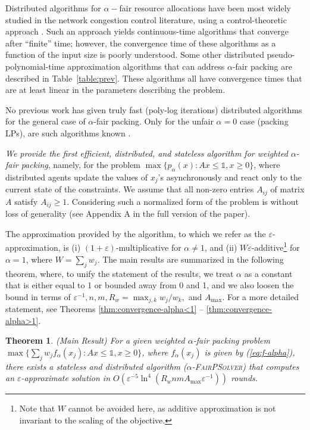 \documentclass[11pt]{article}
\makeatletter
\newcommand{\wratio}{R_w}
\newtheorem{theorem}{Theorem}[section]
\renewcommand{\paragraph}{\@startsection{paragraph}{4}{\z@}{1ex \@plus 1ex \@minus .2ex}{-.5em}{\normalfont\normalsize\bfseries}}
\newif\iffullpaper
\makeatother
\begin{document}
Distributed algorithms for $\alpha-$fair resource allocations have been most widely studied in the network congestion control literature, using a control-theoretic approach \cite{kelly1998rate, kelly2014stochastic, yi2008stochastic, paganini2005congestion, MoWalrand2000, low2002internet}. Such an approach yields continuous-time algorithms that converge after ``finite'' time; however, the convergence time of these algorithms as a function of the input size is poorly understood. Some  other distributed pseudo-polynomial-time approximation algorithms that can address $\alpha$-fair packing are described in Table~\ref{table:prev}. These algorithms all have convergence times that are at least linear in the parameters describing the problem.  

No previous work has given truly fast (poly-log iterations) distributed algorithms for the general case of $\alpha$-fair packing.  Only for the unfair $\alpha=0$ case (packing LPs), are such algorithms  known \cite{AwerbuchKhandekar2009, d-luby1993parallel, d-bartal1997global, dc-young2001sequential, d-kuhn2006price, d-allen2014using}.


\paragraph{Our Results.} 
\emph{We provide the first  efficient, distributed, {and stateless} algorithm for weighted $\alpha$-fair packing}, namely, for the problem $\max\{p_\alpha(x): Ax\leq \mathds{1}, x\geq 0\}$,  {where distributed agents update the values of $x_j$'s asynchronously and react only to the current state of the constraints}. We assume that all non-zero entries $A_{ij}$ of matrix $A$ satisfy $A_{ij}\geq 1$. Considering such a normalized form of the problem is without loss of generality (see Appendix \iffullpaper \ref{appendix:scaling}\else {A} in the full version of the paper\fi).  

The approximation provided by the algorithm, to which we refer as the  $\varepsilon$-approximation, is (i) $(1+\varepsilon)$-multiplicative for $\alpha \neq 1$, and (ii) $W\varepsilon$-additive\footnote{Note that $W$ cannot be avoided here, as additive approximation is not invariant to the scaling of the objective.} for $\alpha = 1$, where $W = \sum_j w_j$. The main results are summarized in the following theorem, where, to unify the statement of the results, we treat $\alpha$ as a constant that is either equal to 1 or bounded away from 0 and 1, and we also loosen the bound in terms of $\varepsilon^{-1}, n, m, \wratio = \max_{j, k} {w_j}/{w_k},$ and $A_{\max}$. For a more detailed statement, see Theorems \ref{thm:convergence-alpha<1} -- \ref{thm:convergence-alpha>1}. 
\begin{theorem}
(Main Result) For a given weighted $\alpha$-fair packing problem $\max\{\sum_j w_j f_\alpha(x_j): Ax\leq \mathds{1}, x\geq 0\}$, where $f_{\alpha}(x_j)$ is given by (\ref{eq:f-alpha}), there exists a stateless and distributed algorithm (\textsc{$\alpha$-FairPSolver}) that computes an $\varepsilon$-approximate solution in ${O}(\varepsilon^{-5}\ln^4(\wratio nmA_{\max}\varepsilon^{-1}))$ rounds.   
\end{theorem}
\end{document}
